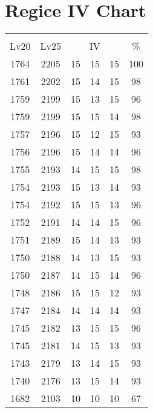 \documentclass{article}%
\begin{document}
%
\normalsize%
\section{Regice IV Chart}%
\label{sec:Regice IV Chart}%
\renewcommand{\arraystretch}{1.5}%
\begin{tabular}{|c|c|c|c|c|c|}%
\hline%
\multicolumn{6}{|c|}{\textcolor{white}{ 
\linebreak{Regice}
}%
\cellcolor{black}}\\%
\multicolumn{1}{|c}{Lv20}&\multicolumn{1}{c|}{Lv25}&\multicolumn{3}{c|}{IV}&\multicolumn{1}{|c|}{\%}\\%
\hline%
\rowcolor{color100}%
1764&2205&15&15&15&100\\%
\hline%
\rowcolor{color98}%
1761&2202&15&14&15&98\\%
\hline%
\rowcolor{color96}%
1759&2199&15&13&15&96\\%
\hline%
\rowcolor{color98}%
1759&2199&15&15&14&98\\%
\hline%
\rowcolor{color93}%
1757&2196&15&12&15&93\\%
\hline%
\rowcolor{color96}%
1756&2196&15&14&14&96\\%
\hline%
\rowcolor{color98}%
1755&2193&14&15&15&98\\%
\hline%
\rowcolor{color93}%
1754&2193&15&13&14&93\\%
\hline%
\rowcolor{color96}%
1754&2192&15&15&13&96\\%
\hline%
\rowcolor{color96}%
1752&2191&14&14&15&96\\%
\hline%
\rowcolor{color93}%
1751&2189&15&14&13&93\\%
\hline%
\rowcolor{color93}%
1750&2188&14&13&15&93\\%
\hline%
\rowcolor{color96}%
1750&2187&14&15&14&96\\%
\hline%
\rowcolor{color93}%
1748&2186&15&15&12&93\\%
\hline%
\rowcolor{color93}%
1747&2184&14&14&14&93\\%
\hline%
\rowcolor{color96}%
1745&2182&13&15&15&96\\%
\hline%
\rowcolor{color93}%
1745&2181&14&15&13&93\\%
\hline%
\rowcolor{color93}%
1743&2179&13&14&15&93\\%
\hline%
\rowcolor{color93}%
1740&2176&13&15&14&93\\%
\hline%
\rowcolor{color91}%
1682&2103&10&10&10&67\\%
\end{tabular}

%
\end{document}
